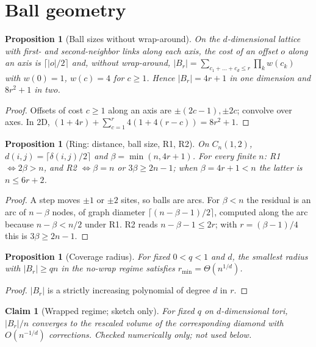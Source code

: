 \documentclass[aps,pre,onecolumn,superscriptaddress,amsmath,amssymb,longbibliography]{revtex4-2}
\newtheorem{proposition}[theorem]{Proposition}
\newtheorem{claim}[theorem]{Claim}
\theoremstyle{definition}
\theoremstyle{remark}
\begin{document}
\section{Ball geometry}
\label{sec:S3}

\begin{proposition}[Ball sizes without wrap-around]
\label{prop:B1}
On the $d$-dimensional lattice with first- and second-neighbor links
along each axis, the cost of an offset $o$ along an axis is
$\lceil|o|/2\rceil$ and, without wrap-around,
$|B_r|=\sum_{c_1+\dots+c_d\le r}\prod_kw(c_k)$ with $w(0)=1$, $w(c)=4$ for
$c\ge1$. Hence $|B_r|=4r+1$ in one dimension and $8r^2+1$ in two.
\end{proposition}
\begin{proof}
Offsets of cost $c\ge1$ along an axis are $\pm(2c-1),\pm2c$; convolve over
axes. In 2D, $(1+4r)+\sum_{c=1}^{r}4(1+4(r-c))=8r^2+1$.
\end{proof}

\begin{proposition}[Ring: distance, ball size, R1, R2]
\label{prop:B2}
On $C_n(1,2)$, $d(i,j)=\lceil\delta(i,j)/2\rceil$ and $\beta=\min(n,4r+1)$.
For every finite $n$: R1 $\iff2\beta>n$, and R2 $\iff\beta=n$ or
$3\beta\ge2n-1$; when $\beta=4r+1<n$ the latter is $n\le6r+2$.
\end{proposition}
\begin{proof}
A step moves $\pm1$ or $\pm2$ sites, so balls are arcs. For $\beta<n$ the
residual is an arc of $n-\beta$ nodes, of graph diameter
$\lceil(n-\beta-1)/2\rceil$, computed along the arc because
$n-\beta<n/2$ under R1. R2 reads $n-\beta-1\le2r$; with $r=(\beta-1)/4$
this is $3\beta\ge2n-1$.
\end{proof}

\begin{proposition}[Coverage radius]
\label{prop:B3}
For fixed $0<q<1$ and $d$, the smallest radius with $|B_r|\ge qn$ in the
no-wrap regime satisfies $r_{\min}=\Theta(n^{1/d})$.
\end{proposition}
\begin{proof}
$|B_r|$ is a strictly increasing polynomial of degree $d$ in $r$.
\end{proof}

\begin{claim}[Wrapped regime; sketch only]
\label{cl:B4}
For fixed $q$ on $d$-dimensional tori, $|B_r|/n$ converges to the
rescaled volume of the corresponding diamond with $O(n^{-1/d})$
corrections. Checked numerically only; not used below.
\end{claim}
\end{document}

